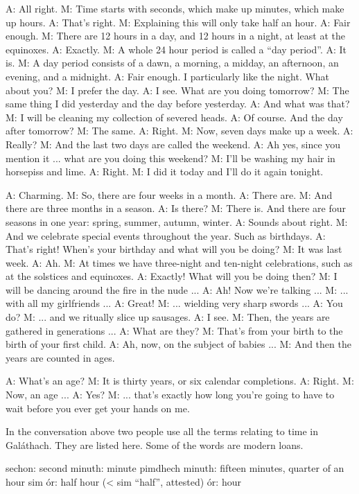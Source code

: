 A: All right.
M: Time starts with seconds, which make up minutes, which make up hours.
A: That’s right.
M: Explaining this will only take half an hour.
A: Fair enough.
M: There are 12 hours in a day, and 12 hours in a night, at least at the equinoxes.
A: Exactly.
M: A whole 24 hour period is called a “day period”.
A: It is.
M: A day period consists of a dawn, a morning, a midday, an afternoon, an evening, and a midnight.
A: Fair enough. I particularly like the night. What about you?
M: I prefer the day.
A: I see. What are you doing tomorrow?
M: The same thing I did yesterday and the day before yesterday.
A: And what was that?
M: I will be cleaning my collection of severed heads.
A: Of course. And the day after tomorrow?
M: The same.
A: Right.
M: Now, seven days make up a week.
A: Really?
M: And the last two days are called the weekend.
A: Ah yes, since you mention it ... what are you doing this weekend?
M: I’ll be washing my hair in horsepiss and lime.
A: Right.
M: I did it today and I’ll do it again tonight.

A: Charming.
M: So, there are four weeks in a month.
A: There are.
M: And there are three months in a season.
A: Is there?
M: There is. And there are four seasons in one year: spring, summer, autumn, winter.
A: Sounds about right.
M: And we celebrate special events throughout the year. Such as birthdays.
A: That’s right! When’s your birthday and what will you be doing?
M: It was last week.
A: Ah.
M: At times we have three-night and ten-night celebrations, such as at the solstices and equinoxes.
A: Exactly! What will you be doing then?
M: I will be dancing around the fire in the nude ...
A: Ah! Now we’re talking ...
M: ... with all my girlfriends ...
A: Great!
M: ... wielding very sharp swords ...
A: You do?
M: ... and we ritually slice up sausages.
A: I see.
M: Then, the years are gathered in generations ...
A: What are they?
M: That’s from your birth to the birth of your first child.
A: Ah, now, on the subject of babies ...
M: And then the years are counted in ages.

A: What’s an age?
M: It is thirty years, or six calendar completions.
A: Right.
M: Now, an age ...
A: Yes?
M: ... that’s exactly how long you’re going to have to wait before you ever get your hands on me.

In the conversation above two people use all the terms relating to time in Gal\'{a}thach. They are listed here. Some of the words are modern loans.

sechon: second 
minuth: minute 
pimdhech minuth: fifteen minutes, quarter of an hour 
sim \'{o}r: half hour (< sim “half”, attested)
\'{o}r: hour 

